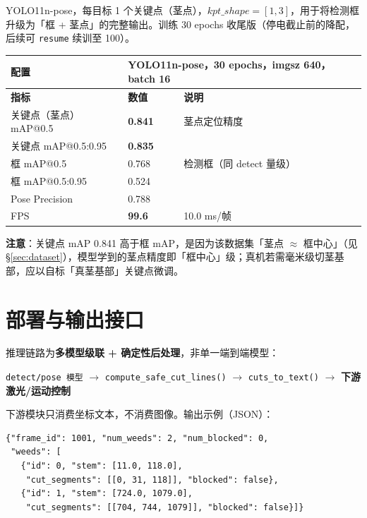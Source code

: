 \documentclass[11pt,a4paper]{article}
\begin{document}
YOLO11n-pose，每目标 1 个关键点（茎点），$kpt\_shape=[1,3]$，用于将检测框升级为「框 + 茎点」的完整输出。训练 30 epochs 收尾版（停电截止前的降配，后续可 \texttt{resume} 续训至 100）。

\begin{table}[h]
\centering
\begin{tabular}{lll}
\toprule
\textbf{配置} & \multicolumn{2}{l}{YOLO11n-pose，30 epochs，imgsz 640，batch 16} \\
\midrule
\textbf{指标} & \textbf{数值} & \textbf{说明} \\
\midrule
关键点（茎点）mAP@0.5 & \textbf{0.841} & 茎点定位精度 \\
关键点 mAP@0.5:0.95 & \textbf{0.835} & \\
框 mAP@0.5 & 0.768 & 检测框（同 detect 量级） \\
框 mAP@0.5:0.95 & 0.524 & \\
Pose Precision & 0.788 & \\
FPS & \textbf{99.6} & 10.0 ms/帧 \\
\bottomrule
\end{tabular}
\end{table}

\textbf{注意}：关键点 mAP 0.841 高于框 mAP，是因为该数据集「茎点 $\approx$ 框中心」（见 \S\ref{sec:dataset}），模型学到的茎点精度即「框中心」级；真机若需毫米级切茎基部，应以自标「真茎基部」关键点微调。

\section{部署与输出接口}

推理链路为\textbf{多模型级联 + 确定性后处理}，非单一端到端模型：

\begin{center}
\texttt{detect/pose 模型} $\to$ \texttt{compute\_safe\_cut\_lines()} $\to$ \texttt{cuts\_to\_text()} $\to$ \textbf{下游激光/运动控制}
\end{center}

下游模块只消费坐标文本，不消费图像。输出示例（JSON）：

\begin{verbatim}
{"frame_id": 1001, "num_weeds": 2, "num_blocked": 0,
 "weeds": [
   {"id": 0, "stem": [11.0, 118.0],
    "cut_segments": [[0, 31, 118]], "blocked": false},
   {"id": 1, "stem": [724.0, 1079.0],
    "cut_segments": [[704, 744, 1079]], "blocked": false}]}
\end{verbatim}
\end{document}
